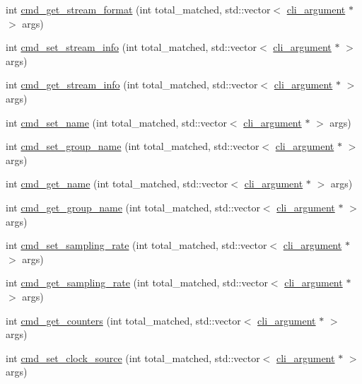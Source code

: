 \begin{DoxyCompactItemize}
int \hyperlink{classcmd__line_a481f4151d6ba2898953c8757298f55ce}{cmd\+\_\+get\+\_\+stream\+\_\+format} (int total\+\_\+matched, std\+::vector$<$ \hyperlink{classcli__argument}{cli\+\_\+argument} $\ast$ $>$ args)
\item 
int \hyperlink{classcmd__line_ab0e730e5b0378ee260dea25ba8eed459}{cmd\+\_\+set\+\_\+stream\+\_\+info} (int total\+\_\+matched, std\+::vector$<$ \hyperlink{classcli__argument}{cli\+\_\+argument} $\ast$ $>$ args)
\item 
int \hyperlink{classcmd__line_ae6972fce5d12e11d46134a3887f91948}{cmd\+\_\+get\+\_\+stream\+\_\+info} (int total\+\_\+matched, std\+::vector$<$ \hyperlink{classcli__argument}{cli\+\_\+argument} $\ast$ $>$ args)
\item 
int \hyperlink{classcmd__line_a4181414fb1570d41849446767ff1b544}{cmd\+\_\+set\+\_\+name} (int total\+\_\+matched, std\+::vector$<$ \hyperlink{classcli__argument}{cli\+\_\+argument} $\ast$ $>$ args)
\item 
int \hyperlink{classcmd__line_af7858348fd722d4f184031bcbdc3fed3}{cmd\+\_\+set\+\_\+group\+\_\+name} (int total\+\_\+matched, std\+::vector$<$ \hyperlink{classcli__argument}{cli\+\_\+argument} $\ast$ $>$ args)
\item 
int \hyperlink{classcmd__line_a33941d08707eaa3e1eb57910a2e67de3}{cmd\+\_\+get\+\_\+name} (int total\+\_\+matched, std\+::vector$<$ \hyperlink{classcli__argument}{cli\+\_\+argument} $\ast$ $>$ args)
\item 
int \hyperlink{classcmd__line_a56481509c218ebbd521cd60a0aab31fb}{cmd\+\_\+get\+\_\+group\+\_\+name} (int total\+\_\+matched, std\+::vector$<$ \hyperlink{classcli__argument}{cli\+\_\+argument} $\ast$ $>$ args)
\item 
int \hyperlink{classcmd__line_af21cc234e95dba0e6c646e1ca67b57ad}{cmd\+\_\+set\+\_\+sampling\+\_\+rate} (int total\+\_\+matched, std\+::vector$<$ \hyperlink{classcli__argument}{cli\+\_\+argument} $\ast$ $>$ args)
\item 
int \hyperlink{classcmd__line_a301f6afb5cbc6caa761c11096f9d5c96}{cmd\+\_\+get\+\_\+sampling\+\_\+rate} (int total\+\_\+matched, std\+::vector$<$ \hyperlink{classcli__argument}{cli\+\_\+argument} $\ast$ $>$ args)
\item 
int \hyperlink{classcmd__line_a0755c104c8ceca24300025ecf1ed1c4d}{cmd\+\_\+get\+\_\+counters} (int total\+\_\+matched, std\+::vector$<$ \hyperlink{classcli__argument}{cli\+\_\+argument} $\ast$ $>$ args)
\item 
int \hyperlink{classcmd__line_a73d334537ebbccbe0807b12b0c8019ee}{cmd\+\_\+set\+\_\+clock\+\_\+source} (int total\+\_\+matched, std\+::vector$<$ \hyperlink{classcli__argument}{cli\+\_\+argument} $\ast$ $>$ args)

\end{DoxyCompactItemize}

